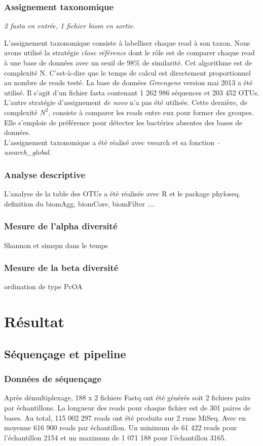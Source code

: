 \documentclass[12pt,a4paper]{article}
\begin{document}
\subsubsection{Assignement taxonomique} \begin{center}\emph{2 fasta en entrée,  1 fichier biom  en sortie. }\end{center} 

L’assignement taxonomique consiste à labelliser chaque read à son taxon. Nous avons utilisé la stratégie \textit{close référence} dont le rôle est de comparer chaque read à une base de données avec un seuil de 98\% de similarité. Cet algorithme est de complexité N. C'est-à-dire que le temps de calcul est directement proportionnel au nombre de reads testé. La base de données \textit{Greengene} version mai 2013  a été utilisé. Il s'agit d'un fichier fasta contenant 1 262 986 séquences et 203 452 OTUs. \\
L'autre stratégie d'assignement \textit{de novo} n'a pas été utilisée. Cette dernière, de complexité $N^{2}$, consiste à comparer les reads entre eux pour former des groupes. Elle s'emploie de préférence pour détecter les bactéries absentes des bases de données. \\
L'assignement taxonomique a été réalisé avec vsearch et sa fonction \textit{--usearch\_global}. 

\subsubsection{Analyse descriptive}
L'analyse de la table des OTUs a été réalisée avec R et le package phyloseq. 
definition du biomAgg, biomCore, biomFilter ....
\subsubsection{Mesure de l'alpha diversité}
Shannon et simspn dans le temps 
\subsubsection{Mesure de la beta diversité}
ordination de type PcOA

\section{Résultat}
\subsection{Séquençage et pipeline}
\subsubsection{Données de séquençage}
Après démultiplexage, 188 x 2 fichiers Fastq ont été générés soit 2 fichiers pairs par échantillons.
La longueur des reads pour chaque fichier est de 301 paires de bases.
Au total, 115 002 297 reads ont été produits sur 2 runs MiSeq. Avec en moyenne 616 900 reads par échantillon. Un minimum de 61 422 reads pour l’échantillon 2154 et un maximum de 1 071 188 pour l’échantillon 3165.
\end{document}
